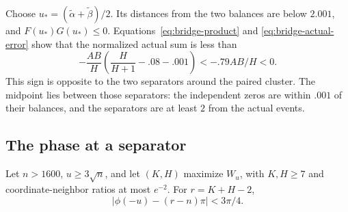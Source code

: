 Choose $u_*=(\widetilde\alpha+\widetilde\beta)/2$.
Its distances from the two balances are below $2.001$, and
$F(u_*)G(u_*)\le0$. Equations~\eqref{eq:bridge-product} and
\eqref{eq:bridge-actual-error} show that the normalized actual sum is
less than
\[
 -\frac{AB}{H}\left(\frac H{H+1}-.08-.001\right)<-.79AB/H<0.
\]
This sign is opposite to the two separators around the paired cluster.
The midpoint lies between those separators: the independent zeros
are within $.001$ of their balances, and the separators are at least
$2$ from the actual events.

\subsection{The phase at a separator}

\begin{lemma}\label{lem:bridge-phase}
Let $n>1600$, $u\ge3\sqrt n$, and let $(K,H)$ maximize $W_u$, with
$K,H\ge7$ and coordinate-neighbor ratios at most $e^{-2}$.
For $r=K+H-2$,
\[
 |\phi(-u)-(r-n)\pi|<3\pi/4.
\]
\end{lemma}

